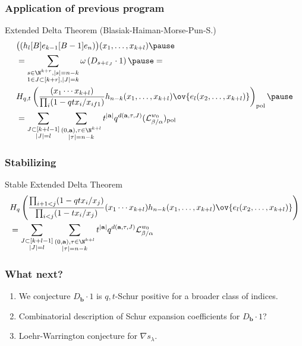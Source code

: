 \documentclass{beamer}
\newcommand{\Lcal}{{\mathcal L}}
\newcommand{\bb}{{\mathbf b}}
\newcommand{\aA}{{\mathbf a}}
\DeclareMathOperator{\pol}{pol}
\begin{document}
\begin{frame}
  \frametitle{Application of previous program}
  \begin{block}{Extended Delta Theorem (Blasiak-Haiman-Morse-Pun-S.)}
    \begin{eqnarray*}
      & \bigl( ( h_l[B]e_{k-1}[B-1] e_{n}) \bigr)
      (x_1,\ldots,x_{k+l})\pause \\
      & \displaystyle = \sum_{\substack{s \in \N^{k+r}, |s|=n-k \\ 1 \in J\subset [k+r],
      |J|=k}} \omega \left(D_{s+\varepsilon_J} \cdot 1\right)\pause = \\
      &H_{q,t}\left(
        \frac{ (x_1\cdots
        x_{k+l})}{\prod_{i}(1-qt
      x_i/x_{if1})}h_{n-k}(x_1,\ldots,x_{k+l})\ov{e_l(x_2,\ldots,x_{k+l})}
        \right)_{\pol}\pause\\
      & \displaystyle = \sum_{\substack{J \subset [k+l-1] \\ |J|=l}}
      \sum_{\substack{(0,\aA),\tau \in \N^{k+l} \\ |\tau| = n-k}}
      t^{|\aA|} q^{d(\aA,\tau,J)} (\Lcal_{\beta/\alpha}^{w_0})_{\pol}
    \end{eqnarray*}
  \end{block}
\end{frame}
\begin{frame}
  \frametitle{Stabilizing}
  \begin{block}{Stable Extended Delta Theorem}
    \begin{align*}
      &H_q\left(
        \frac{\prod_{i+1<j} (1-qt x_i/x_j)}{\prod_{i<j}(1-t
      x_i/x_j)}(x_1\cdots
        x_{k+l})h_{n-k}(x_1,\ldots,x_{k+l})\ov{e_l(x_2,\ldots,x_{k+l})}
      \right) \\
      & = \sum_{\substack{J \subset [k+l-1] \\ |J|=l}}
      \sum_{\substack{(0,\aA),\tau \in \N^{k+l} \\ |\tau| = n-k}}
      t^{|\aA|} q^{d(\aA,\tau,J)} \Lcal_{\beta/\alpha}^{w_0}
    \end{align*}
  \end{block}
\end{frame}
\begin{frame}
  \frametitle{What next?}
  \begin{enumerate}
  \item We conjecture \(D_\bb \cdot 1\) is \(q,t\)-Schur positive for
    a broader class of indices.\pause
  \item Combinatorial description of Schur expansion coefficients for
    \(D_\bb \cdot 1\)?\pause
  \item Loehr-Warrington conjecture for \(\nabla s_\lambda\).
  \end{enumerate}
\end{frame}
\end{document}
